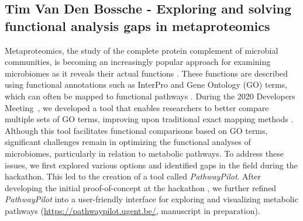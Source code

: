 \subsection{Tim Van Den Bossche - Exploring and solving functional analysis gaps in metaproteomics}

Metaproteomics, the study of the complete protein complement of microbial communities, is becoming an increasingly popular approach for examining microbiomes as it reveals their actual functions \citep{VanDenBossche2021}. These functions are described using functional annotations such as InterPro and Gene Ontology (GO) terms, which can often be mapped to functional pathways \citep{Schiebenhoefer2019}. During the 2020 Developers Meeting~\citep{EuBIC-MS2020}, we developed a tool that enables researchers to better compare multiple sets of GO terms, improving upon traditional exact mapping methods \citep{Verschaffelt2021}. Although this tool facilitates functional comparisons based on GO terms, significant challenges remain in optimizing the functional analyses of microbiomes, particularly in relation to metabolic pathways. To address these issues, we first explored various options and identified gaps in the field during the hackathon. This led to the creation of a tool called \emph{PathwayPilot}. After developing the initial proof-of-concept at the hackathon \citep{issue7}, we further refined \emph{PathwayPilot} into a user-friendly interface for exploring and visualizing metabolic pathways (\url{https://pathwaypilot.ugent.be/}, manuscript in preparation).

